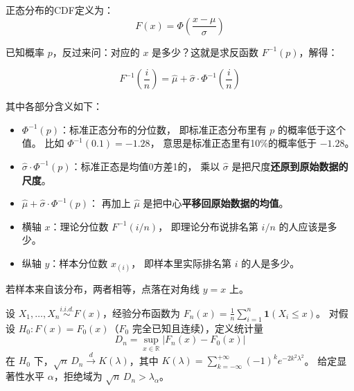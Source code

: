 \begin{note}[正态分布理论分位数公式推导]

正态分布的CDF定义为：
$$F(x) = \Phi\!\left(\frac{x - \mu}{\sigma}\right)$$

已知概率 $p$，反过来问：对应的 $x$ 是多少？这就是求反函数 $F^{-1}(p)$，解得：

$$F^{-1}\!\left(\frac{i}{n}\right) = \hat{\mu} + \hat{\sigma} \cdot \Phi^{-1}\!\left(\frac{i}{n}\right)$$

其中各部分含义如下：

\begin{itemize}
    \item $\Phi^{-1}(p)$：标准正态分布的分位数，
    即标准正态分布里有 $p$ 的概率低于这个值。
    比如 $\Phi^{-1}(0.1) = -1.28$，
    意思是标准正态里有10\%的概率低于 $-1.28$。

    \item $\hat{\sigma} \cdot \Phi^{-1}(p)$：标准正态是均值0方差1的，
    乘以 $\hat{\sigma}$ 是把尺度\textbf{还原到原始数据的尺度}。

    \item $\hat{\mu} + \hat{\sigma} \cdot \Phi^{-1}(p)$：
    再加上 $\hat{\mu}$ 是把中心\textbf{平移回原始数据的均值}。
\end{itemize}

\end{note}
\begin{note}

\begin{itemize}
    \item 横轴 $x$：理论分位数 $F^{-1}(i/n)$，
    即理论分布说排名第 $i/n$ 的人应该是多少。

    \item 纵轴 $y$：样本分位数 $x_{(i)}$，
    即样本里实际排名第 $i$ 的人是多少。
\end{itemize}

若样本来自该分布，两者相等，点落在对角线 $y = x$ 上。

\end{note}
\begin{definition}
设 $X_1, \ldots, X_n \overset{i.i.d.}{\sim} F(x)$，经验分布函数为
$F_n(x) = \frac{1}{n}\sum_{i=1}^n \mathbf{1}(X_i \leq x)$。
对假设 $H_0: F(x) = F_0(x)$（$F_0$ 完全已知且连续），定义统计量
$$D_n = \sup_{x\in\mathbb{R}} |F_n(x) - F_0(x)|$$
在 $H_0$ 下，$\sqrt{n}\,D_n \xrightarrow{d} K(\lambda)$，其中
$K(\lambda) = \sum_{k=-\infty}^{+\infty}(-1)^k e^{-2k^2\lambda^2}$。
给定显著性水平 $\alpha$，拒绝域为 $\sqrt{n}\,D_n > \lambda_\alpha$。
\end{definition}
